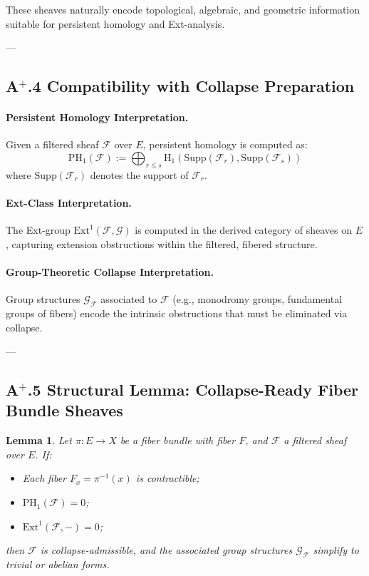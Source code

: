 \documentclass[11pt]{article}
\newtheorem{lemma}[theorem]{Lemma}
\begin{document}
These sheaves naturally encode topological, algebraic, and geometric information suitable for persistent homology and Ext-analysis.

---

\subsection*{A$^{+}$.4 Compatibility with Collapse Preparation}

\paragraph{Persistent Homology Interpretation.}

Given a filtered sheaf $\mathcal{F}$ over $E$, persistent homology is computed as:
\[
\mathrm{PH}_1(\mathcal{F}) := \bigoplus_{r \leq s} \mathrm{H}_1\left( \mathrm{Supp}(\mathcal{F}_r), \mathrm{Supp}(\mathcal{F}_s) \right)
\]
where $\mathrm{Supp}(\mathcal{F}_r)$ denotes the support of $\mathcal{F}_r$.

\paragraph{Ext-Class Interpretation.}

The Ext-group $\mathrm{Ext}^1(\mathcal{F}, \mathcal{G})$ is computed in the derived category of sheaves on $E$, capturing extension obstructions within the filtered, fibered structure.

\paragraph{Group-Theoretic Collapse Interpretation.}

Group structures $\mathcal{G}_{\mathcal{F}}$ associated to $\mathcal{F}$ (e.g., monodromy groups, fundamental groups of fibers) encode the intrinsic obstructions that must be eliminated via collapse.

---

\subsection*{A$^{+}$.5 Structural Lemma: Collapse-Ready Fiber Bundle Sheaves}

\begin{lemma}
Let $\pi : E \to X$ be a fiber bundle with fiber $F$, and $\mathcal{F}$ a filtered sheaf over $E$. If:

\begin{itemize}
    \item Each fiber $F_x = \pi^{-1}(x)$ is contractible;
    \item $\mathrm{PH}_1(\mathcal{F}) = 0$;
    \item $\mathrm{Ext}^1(\mathcal{F}, -) = 0$;
\end{itemize}

then $\mathcal{F}$ is collapse-admissible, and the associated group structures $\mathcal{G}_{\mathcal{F}}$ simplify to trivial or abelian forms.
\end{lemma}
\end{document}
